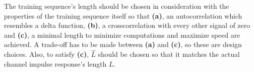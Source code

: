 \documentclass[11pt,titlepage]{report}
\begin{document}
The training sequence's length should be chosen in consideration with the properties of the training sequence itself so that \textbf{(a)}, an autocorrelation which resembles a delta function, \textbf{(b)}, a crosscorrelation with every other signal of zero and \textbf{(c)}, a minimal length to minimize computations and maximize speed are achieved. A trade-off has to be made between \textbf{(a)} and \textbf{(c)}, so these are design choices. Also, to satisfy \textbf{(c)}, $\hat{L}$ should be chosen so that it matches the actual channel impulse response's length $L$.
\end{document}
